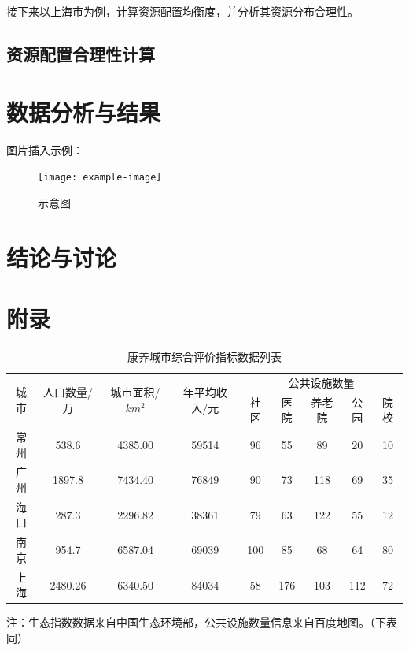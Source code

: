 \documentclass[12pt,a4paper]{article}
\begin{document}
\begin{multicols}{2}
接下来以上海市为例，计算资源配置均衡度，并分析其资源分布合理性。
\subsection{资源配置合理性计算}



\section{数据分析与结果}
图片插入示例：
\begin{figure}[h]
    \centering
    \texttt{[image: example-image]} %
    \caption{示意图}
\end{figure}

\section{结论与讨论}

\end{multicols}
\newpage
\section*{附录}

\begin{table}[h]
  \centering
  \caption{康养城市综合评价指标数据列表}
  \begin{tabular}{c|c|c|c|ccccc}
    \toprule[2pt]
    \multirow{2}{*}{城市} & \multirow{2}{*}{人口数量/万} & \multirow{2}{*}{城市面积/$km^2$}& \multirow{2}{*}{年平均收入/元}& \multicolumn{5}{c}{公共设施数量} \\
\cline{5-9}
& & & & 社区 & 医院 & 养老院 & 公园 & 院校 \\
    \midrule[1pt]
    常州 & 538.6 & 4385.00 &59514& 96 & 55 & 89 & 20 & 10 \\
    广州 & 1897.8 & 7434.40 &76849& 90 & 73 & 118 & 69 & 35 \\
    海口 & 287.3 & 2296.82 &38361& 79 & 63 & 122 & 55 & 12 \\
    南京 & 954.7 & 6587.04 &69039& 100 & 85 & 68 & 64 & 80\\
    上海 & 2480.26 & 6340.50 &84034& 58 & 176 & 103 & 112 & 72 \\
    \bottomrule[2pt]
  \end{tabular}

  \vspace{0.5em}
  {\footnotesize 注：生态指数数据来自中国生态环境部，公共设施数量信息来自百度地图。（下表同）}
\end{table}
\end{document}
